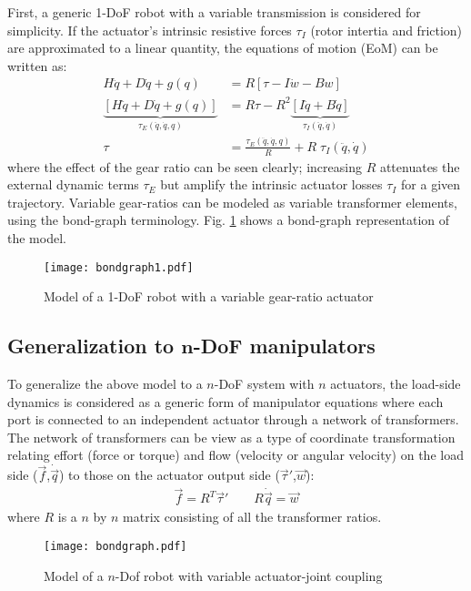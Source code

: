 First, a generic 1-DoF robot with a variable transmission is considered for simplicity. If the actuator's intrinsic resistive forces $\tau_I$ (rotor intertia and friction) are approximated to a linear quantity, the equations of motion (EoM) can be written as:
%
\begin{align}
  H \ddot{q} + D \dot{q} + g( q )	&= R  \left[ \tau - I \dot{w} - B w	\right] \\
	\underbrace{\left[	H \ddot{q} + D \dot{q} + g( q )	\right]}_{\tau_{E}(\ddot{q},\dot{q},q)}
	&= R \tau - R^2
	\underbrace{\left[ I \ddot{q} + B \dot{q}	\right]}_{\tau_{I}(\ddot{q},\dot{q})} \\
	\tau &= 	\frac{\tau_{E}(\ddot{q},\dot{q},q)}{R} + R \; \tau_{I}(\ddot{q},\dot{q})
	\label{eq:1dofEoM}
\end{align}
%
where the effect of the gear ratio can be seen clearly; increasing $R$ attenuates the external dynamic terms $\tau_{E}$ but amplify the intrinsic actuator losses $\tau_{I}$ for a given trajectory.
%
Variable gear-ratios can be modeled as variable transformer elements, using the bond-graph terminology. Fig. \ref{fig:bondgraph1} shows a bond-graph representation of the model.
%
\begin{figure}[htp]
	\centering
		\texttt{[image: bondgraph1.pdf]}
	\caption{Model of a 1-DoF robot with a variable gear-ratio actuator}
	\label{fig:bondgraph1}
\end{figure}


\subsection{Generalization to $\boldsymbol{n}$-DoF manipulators}
\label{sec:GeneralizationToNDOFManipulators}

To generalize the above model to a $n$-DoF system with $n$ actuators, the load-side dynamics is considered as a generic form of manipulator equations where each port is connected to an independent actuator through a network of transformers. The network of transformers can be view as a type of coordinate transformation relating effort (force or torque) and flow (velocity or angular velocity) on the load side ($\vec{f}$,$\dot{\vec{q}}$) to those on the actuator output side ($\vec{\tau}'$,$\vec{w}$):
%
\begin{align}
	\vec{ f } = R^T \vec{\tau}' \quad  \quad R \dot{ \vec{q} } = \vec{w}
 \label{eq:coortransform}
\end{align}
%
where $R$ is a $n$ by $n$ matrix consisting of all the transformer ratios. 
%
\begin{figure}[htp]
	\centering
		\texttt{[image: bondgraph.pdf]}
	\caption{Model of a $n$-Dof robot with variable actuator-joint coupling}
	\label{fig:bondgraph}
\end{figure}


